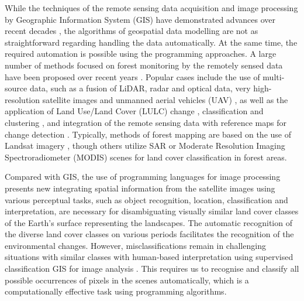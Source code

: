 \documentclass[applsci,article,accept,pdftex,moreauthors]{Definitions/mdpi}
\begin{document}
While the techniques of the remote sensing data acquisition and image processing by Geographic Information System (GIS) have demonstrated advances over recent decades \cite{CHUMA2021100083,Westmanetal1989}, the algorithms of geospatial data modelling are not as straightforward regarding handling the data automatically. At the same time, the required automation is possible using the programming approaches. A large number of methods focused on forest monitoring by the remotely sensed data have been proposed over recent years \cite{6350700,773475,PU2019268,6049235,OHMANN20143}. Popular cases include the use of multi-source data, such as a fusion of LiDAR, radar and optical data, very high-resolution satellite images and unmanned aerial vehicles (UAV) \cite{rs12071087}, as well as the application of Land Use/Land Cover (LULC) change \cite{lambin2003dynamics}, classification and clustering \cite{976841}, and integration of the remote sensing data with reference maps for change detection \cite{rs14164126}. Typically, methods of forest mapping are based on the use of Landsat imagery \cite{1294510,Zhangetal2006,KIM2014178}, though others utilize SAR \cite{rs11242999,858324,7326669,6352093,8035264} or Moderate Resolution Imaging Spectroradiometer (MODIS) scenes \cite{HANSEN20082495,ZHANG201974} for land cover classification in forest areas. 

Compared with GIS, the use of programming languages for image processing presents new  \linebreak integrating spatial information from the satellite images using various perceptual tasks, such as object recognition, location, classification and interpretation, are necessary for disambiguating visually similar land cover classes of the Earth's surface representing the landscapes. The automatic recognition of the diverse land cover classes on various periods facilitates the recognition of the environmental changes. However, misclassifications remain in challenging situations with similar classes with human-based interpretation using supervised classification GIS for image analysis \cite{HUSSAIN2022103117,ABDELSADEK2022815,HEDAYATI202273}. This requires us to recognise and classify all possible occurrences of pixels in the scenes automatically, which is a computationally effective task using programming algorithms.
\end{document}
